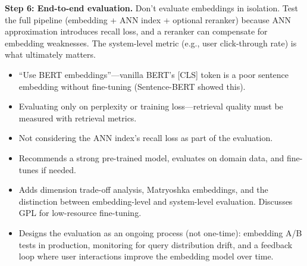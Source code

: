 \begin{interviewq}
\textbf{Step 6: End-to-end evaluation.} Don't evaluate embeddings in isolation. Test the full pipeline (embedding + ANN index + optional reranker) because ANN approximation introduces recall loss, and a reranker can compensate for embedding weaknesses. The system-level metric (e.g., user click-through rate) is what ultimately matters.

\redflags
\begin{itemize}
    \item ``Use BERT embeddings''---vanilla BERT's [CLS] token is a poor sentence embedding without fine-tuning (Sentence-BERT showed this).
    \item Evaluating only on perplexity or training loss---retrieval quality must be measured with retrieval metrics.
    \item Not considering the ANN index's recall loss as part of the evaluation.
\end{itemize}


\goodgreat
\begin{itemize}
    \item {} Recommends a strong pre-trained model, evaluates on domain data, and fine-tunes if needed.
    \item {} Adds dimension trade-off analysis, Matryoshka embeddings, and the distinction between embedding-level and system-level evaluation. Discusses GPL for low-resource fine-tuning.
    \item {} Designs the evaluation as an ongoing process (not one-time): embedding A/B tests in production, monitoring for query distribution drift, and a feedback loop where user interactions improve the embedding model over time.
\end{itemize}

\end{interviewq}